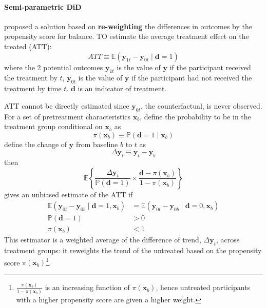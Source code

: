 \documentclass[twoside]{article}
\begin{document}
\paragraph*{Semi-parametric DiD}
\citet{abadie2005semiparametric} proposed a solution based on \textbf{re-weighting} the differences in outcomes by the propensity score for balance. TO estimate the average treatment effect on the treated (ATT):
\begin{equation*}
    ATT\equiv \mathbb{E}\left(\mathbf{y}_{1t}-\mathbf{y}_{0t}\mid \mathbf{d}=1\right)
\end{equation*}
where the 2 potential outcomes $\mathbf{y}_{1t}$ is the value of $\mathbf{y}$ if the participant received the treatment by $t$, $\mathbf{y}_{0t}$ is the value of $\mathbf{y}$ if the participant had not received the treatment by time $t$. $\mathbf{d}$ is an indicator of treatment.

ATT cannot be directly estimated since $\mathbf{y}_{0t}$, the counterfactual, is never observed. For a set of pretreatment characteristics $\mathbf{x}_{b}$, define the probability to be in the treatment group conditional on $\mathbf{x}_b$ as $$ \pi\left(\mathbf{x}_b\right)\equiv \mathbb{P}\left(\mathbf{d}=1\mid \mathbf{x}_b\right) $$
define the change of $\mathbf{y}$ from baseline $b$ to $t$ as $$\Delta \mathbf{y}_t \equiv \mathbf{y}_t - \mathbf{y}_b $$
then
\begin{equation}\label{eq:abadie_att_estimate}
    \mathbb{E}\left\{ \frac{\Delta \mathbf{y}_t}{\mathbb{P}\left(\mathbf{d}=1\right)} \times \frac{\mathbf{d}-\pi\left(\mathbf{x}_b\right)}{1-\pi\left(\mathbf{x}_b\right)} \right\}
\end{equation}
gives an unbiased estimate of the ATT if 
\begin{align*}
    \mathbb{E}\left(\mathbf{y}_{0t}-\mathbf{y}_{0b}\mid \mathbf{d}=1,\mathbf{x}_b\right) &= \mathbb{E}\left(\mathbf{y}_{0t}-\mathbf{y}_{0b}\mid \mathbf{d}=0,\mathbf{x}_b\right)\\
    \mathbb{P}\left(\mathbf{d}=1\right) &>0\\
    \pi\left(\mathbf{x}_b\right) &<1
\end{align*}
This estimator is a weighted average of the difference of trend, $\Delta \mathbf{y}_t$, across treatment groups: it reweights the trend of the untreated based on the propensity score $\pi\left(\mathbf{x}_b\right)$\footnote{$\frac{\pi\left(\mathbf{x}_b\right)}{1-\pi\left(\mathbf{x}_b\right)}$ is an increasing function of $\pi\left(\mathbf{x}_b\right)$, hence untreated participants with a higher propensity score are given a higher weight.}.
\end{document}
